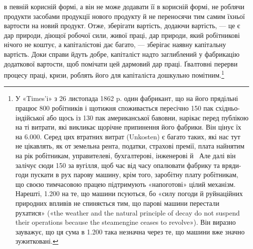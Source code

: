 \parcont{}  %
в певній корисній формі, а він не може додавати її в корисній
формі, не роблячи продукти засобами продукції нового продукту
й не переносячи тим самим їхньої вартости на новий продукт.
Отже, зберігати вартість, додаючи вартість, — це є дар природи,
діющої робочої сили, живої праці, дар природи, який робітникові
нічого не коштує, а капіталістові дає багато, — зберігає наявну
капітальну вартість.  Доки справи йдуть добре, капіталіст
надто заглиблений у фабрикацію додаткової вартости, щоб помічати
цей дармовий дар праці. Ґвалтовні перерви процесу праці,
кризи, роблять його для капіталіста дошкульно помітним.\footnote{
У «Times’i» з 26 листопада 1862 p. один фабрикант, що на його
прядільні працює 800 робітників і щотижня споживається пересічно 150 пак
східньо-індійської або щось із 130 пак американської бавовни, нарікає
перед публікою на ті витрати, які викликає щорічне припинення його
фабрики. Він цінує їх на \num{6.000}. Серед цих втратних
витрат (Unkosten) є багато таких, які нас тут не цікавлять, як от земельна
рента, податки, страхові премії, плата найнятим на рік робітникам, управителеві,
бухгалтерові, інженерові й~ Але далі він залічує сюди
150 за вугілля, щоб час від часу опалювати фабрику та
вряди-годи пускати в рух парову машину, крім того, заробітну плату
робітникам, що своєю тимчасовою працею підтримують «напоготові»
цілий механізм. Нарешті, \num{1.200} на те, що машини псуються,
бо «силу погоди й руйнаційних природних впливів не спиняється
тим, що парові машини перестали рухатися» («the weather and the natural
principle of decay do not suspend their operations because the steamengine
ceases to revolve»). Він виразно зауважує, що ця сума в \num{1.200} така незначна через те, що машини вже значно зужитковані.
}

